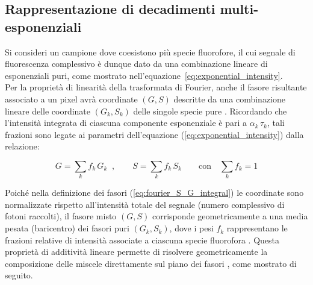 
\subsection{Rappresentazione di decadimenti multi-esponenziali} %
\label{sec:rappresentazione_di_decadimenti_multi_esponenziali}

Si consideri un campione dove coesistono più specie fluorofore, il cui segnale di fluorescenza complessivo è dunque dato da una combinazione lineare di esponenziali puri, come mostrato nell'equazione~\ref{eq:exponential_intensity}.\\
Per la proprietà di linearità della trasformata di Fourier, anche il fasore risultante associato a un pixel avrà coordinate $(G, S)$ descritte da una combinazione lineare delle coordinate $(G_k, S_k)$ delle singole specie pure \cite{torradoLinearCombinationProperties2022}. Ricordando che l'intensità integrata di ciascuna componente esponenziale è pari a $\alpha_k\, \tau_k$, tali frazioni sono legate ai parametri dell'equazione (\ref{eq:exponential_intensity}) dalla relazione:

\begin{equation}
    G = \sum_{k} f_k\, G_k\;\; , \qquad S = \sum_{k} f_k \,S_k \qquad \text{con} \quad \sum_{k} f_k = 1
    \label{eq:phasor_additivity}
\end{equation}

Poiché nella definizione dei fasori (\ref{eq:fourier_S_G_integral}) le coordinate sono normalizzate rispetto all'intensità totale del segnale (numero complessivo di fotoni raccolti), il fasore misto $(G, S)$ corrisponde geometricamente a una media pesata (baricentro) dei fasori puri $(G_k, S_k)$, dove i pesi $f_k$ rappresentano le frazioni relative di intensità associate a ciascuna specie fluorofora \cite{torradoLinearCombinationProperties2022}. 
Questa proprietà di additività lineare permette di risolvere geometricamente la composizione delle miscele direttamente sul piano dei fasori \cite{torradoLinearCombinationProperties2022}, come mostrato di seguito.


